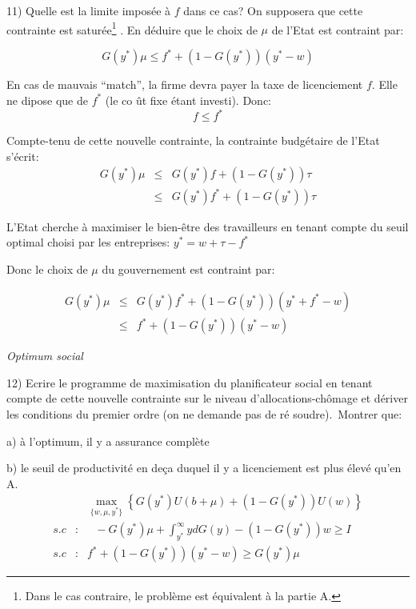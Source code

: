 \documentclass[a4paper]{article}
\begin{document}
\bigskip

11) Quelle est la limite impos\'{e}e \`{a} $f$ dans ce cas? On supposera que
cette contrainte est satur\'{e}e\footnote{%
Dans le cas contraire, le probl\`{e}me est \'{e}quivalent \`{a} la partie A.}%
. En d\'{e}duire que le choix de $\mu $ de l'Etat est contraint par:

\begin{equation*}
G(y^{\ast })\mu \leq f^{\ast }+\left( 1-G(y^{\ast })\right) (y^{\ast }-w)
\end{equation*}

En cas de mauvais \textquotedblleft match\textquotedblright , la firme devra
payer la taxe de licenciement $f$. Elle ne dipose que de $f^{\ast }$ (le co%
\^{u}t fixe \'{e}tant investi). Donc:%
\begin{equation*}
f\leq f^{\ast }
\end{equation*}

Compte-tenu de cette nouvelle contrainte, la contrainte budg\'{e}taire de
l'Etat s'\'{e}crit:%
\begin{eqnarray*}
G(y^{\ast })\mu &\leq &G(y^{\ast })f+\left( 1-G(y^{\ast })\right) \tau \\
&\leq &G(y^{\ast })f^{\ast }+\left( 1-G(y^{\ast })\right) \tau
\end{eqnarray*}

L'Etat cherche \`{a} maximiser le bien-\^{e}tre des travailleurs en tenant
compte du seuil optimal choisi par les entreprises: $y^{\ast }=w+\tau
-f^{\ast }$

Donc le choix de $\mu $ du gouvernement est contraint par:

\begin{eqnarray*}
G(y^{\ast })\mu &\leq &G(y^{\ast })f^{\ast }+\left( 1-G(y^{\ast })\right)
(y^{\ast }+f^{\ast }-w) \\
&\leq &f^{\ast }+\left( 1-G(y^{\ast })\right) (y^{\ast }-w)
\end{eqnarray*}

\textit{Optimum social}

\bigskip

12) Ecrire le programme de maximisation du planificateur social en tenant
compte de cette nouvelle contrainte sur le niveau d'allocations-ch\^{o}mage
et d\'{e}river les conditions du premier ordre (on ne demande pas de r\'{e}%
soudre).\ Montrer que:

a) \`{a} l'optimum, il y a assurance compl\`{e}te

b) le seuil de productivit\'{e} en de\c{c}a duquel il y a licenciement est
plus \'{e}lev\'{e} qu'en A.%
\begin{eqnarray*}
&&\max_{\{w,\mu ,y^{\ast }\}}\left\{ G(y^{\ast })U(b+\mu )+\left(
1-G(y^{\ast })\right) U(w)\right\} \\
s.c &:&\text{ }-G(y^{\ast })\mu +\int_{y^{\ast }}^{\infty }ydG(y)-\left(
1-G(y^{\ast })\right) w\geq I \\
s.c &:&f^{\ast }+\left( 1-G(y^{\ast })\right) (y^{\ast }-w)\geq G(y^{\ast
})\mu
\end{eqnarray*}
\end{document}
